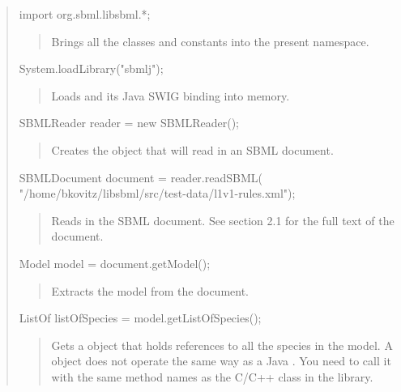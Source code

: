 \documentclass{sbmlmanual}
\begin{document}
\begin{quotation}

\begin{javaVerbatimNoIndent}
import org.sbml.libsbml.*;
\end{javaVerbatimNoIndent}

\begin{quote}
   Brings all the \libsbml{} classes and constants into the
   present namespace.
\end{quote}

\begin{javaVerbatimNoIndent}
System.loadLibrary("sbmlj");
\end{javaVerbatimNoIndent}

\begin{quote}
   Loads \libsbml{} and its Java SWIG binding into memory.
\end{quote}

\begin{javaVerbatimNoIndent}
SBMLReader reader = new SBMLReader();
\end{javaVerbatimNoIndent}

\begin{quote}
   Creates the object that will read in an SBML document.
\end{quote}

\begin{javaVerbatimNoIndent}
SBMLDocument document = reader.readSBML(
   "/home/bkovitz/libsbml/src/test-data/l1v1-rules.xml");
\end{javaVerbatimNoIndent}

\begin{quote}
   Reads in the SBML document.  See section 2.1 for the
   full text of the document.
\end{quote}

\begin{javaVerbatimNoIndent}
Model model = document.getModel();
\end{javaVerbatimNoIndent}

\begin{quote}
   Extracts the model from the document.
\end{quote}

\begin{javaVerbatimNoIndent}
ListOf listOfSpecies = model.getListOfSpecies();
\end{javaVerbatimNoIndent}

\begin{quote}
   Gets a  object that holds references to all the
   species in the model.  A  object does not operate
   the same way as a Java .  You need to call it with
   the same method names as the C/C++  class in the
   \libsbml{} library.
\end{quote}


\end{quotation}
\end{document}
